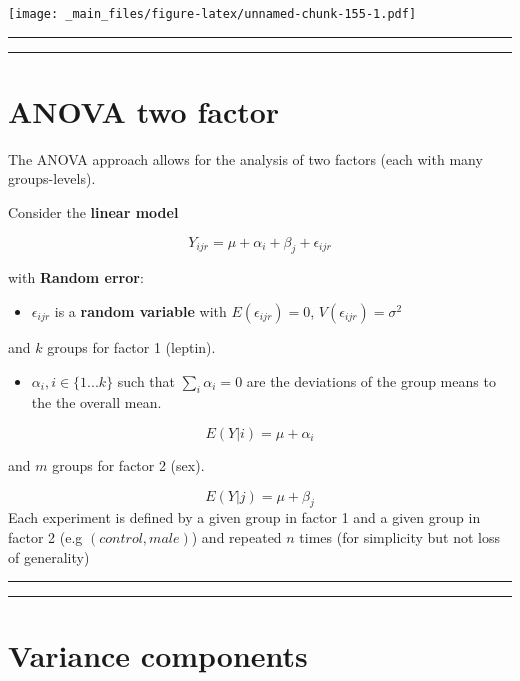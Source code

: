 \documentclass[
]{book}
\providecommand{\tightlist}{%
  \setlength{\itemsep}{0pt}\setlength{\parskip}{0pt}}
\begin{document}
\texttt{[image: \_main\_files/figure-latex/unnamed-chunk-155-1.pdf]}

\begin{center}\rule{0.5\linewidth}{0.5pt}\end{center}

\begin{center}\rule{0.5\linewidth}{0.5pt}\end{center}

\hypertarget{anova-two-factor-1}{%
\section{ANOVA two factor}\label{anova-two-factor-1}}

The ANOVA approach allows for the analysis of two factors (each with many groups-levels).

Consider the \textbf{linear model}

\[Y_{ijr} = \mu + \alpha_i + \beta_j + \epsilon_{ijr}\]

with \textbf{Random error}:

\begin{itemize}
\tightlist
\item
  \(\epsilon_{ijr}\) is a \textbf{random variable} with \(E(\epsilon_{ijr})=0\), \(V(\epsilon_{ijr})=\sigma^2\)
\end{itemize}

and \(k\) groups for factor 1 (leptin).

\begin{itemize}
\tightlist
\item
  \(\alpha_i, i \in\{1...k\}\) such that \(\sum_i \alpha_i=0\) are the deviations of the group means to the the overall mean.
\end{itemize}

\[E(Y|i)=\mu + \alpha_i\]

and \(m\) groups for factor 2 (sex).

\[E(Y|j)=\mu + \beta_j\]
Each experiment is defined by a given group in factor 1 and a given group in factor 2 (e.g \((control, male)\)) and repeated \(n\) times (for simplicity but not loss of generality)

\begin{center}\rule{0.5\linewidth}{0.5pt}\end{center}

\begin{center}\rule{0.5\linewidth}{0.5pt}\end{center}

\hypertarget{variance-components-2}{%
\section{Variance components}\label{variance-components-2}}
\end{document}
